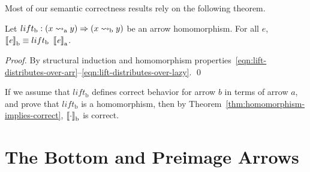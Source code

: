 \documentclass{llncs}
\newcommand{\arrow}{\rightsquigarrow}
\newcommand{\arrowlift}{\ensuremath{lift}}
\newcommand{\gen}{_\mathrm{a}}
\newcommand{\genb}{_\mathrm{b}}
\begin{document}
Most of our semantic correctness results rely on the following theorem.

\begin{theorem}
\label{thm:homomorphism-implies-correct}
Let $\arrowlift\genb : (x \arrow\gen y) \tto (x \arrow\genb y)$ be an arrow homomorphism.
For all $\mathit{e}$, $\meaningof{\mathit{e}}\genb \equiv \arrowlift\genb~\meaningof{\mathit{e}}\gen$.%
\end{theorem}
\begin{proof}
By structural induction and homomorphism properties~\eqref{eqn:lift-distributes-over-arr}--\eqref{eqn:lift-distributes-over-lazy}.
\qed
\end{proof}


If we assume that $\arrowlift\genb$ defines correct behavior for arrow $b$ in terms of arrow $a$, and prove that $\arrowlift\genb$ is a homomorphism, then by Theorem~\ref{thm:homomorphism-implies-correct}, $\meaningof{\cdot}\genb$ is correct.


\section{The Bottom and Preimage Arrows}
\end{document}

